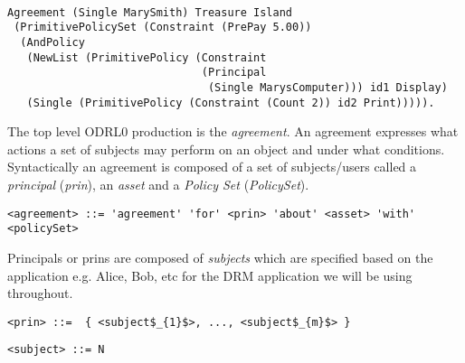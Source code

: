 \lstset{language=Coq}
\begin{lstlisting}[frame=single, caption={Coq version of agreement for Mary Smith},label={lst:marysmithagreementcoq}]

Agreement (Single MarySmith) Treasure Island 
 (PrimitivePolicySet (Constraint (PrePay 5.00))
  (AndPolicy 
   (NewList (PrimitivePolicy (Constraint 
                              (Principal 
                               (Single MarysComputer))) id1 Display)
   (Single (PrimitivePolicy (Constraint (Count 2)) id2 Print))))).
\end{lstlisting}



The top level ODRL0 production is the \emph{agreement}. An agreement expresses what actions a set of subjects may perform on an object and under what conditions. Syntactically an agreement is composed of a set of subjects/users called a \emph{principal} (\emph{prin}), an \emph{asset} and a \emph{Policy Set} (\emph{PolicySet}).

\lstset{language=AST}
\begin{lstlisting}[frame=single, caption={agreement},label={lst:agreementast}]
<agreement> ::= 'agreement' 'for' <prin> 'about' <asset> 'with' <policySet> 
\end{lstlisting}

Principals or prins are composed of \emph{subjects} which are specified based on the application e.g. Alice, Bob, etc for the DRM application we will be using throughout.

\lstset{mathescape, language=AST}  
\begin{lstlisting}[frame=single, caption={prin},label={lst:prinast}]
<prin> ::=  { <subject$_{1}$>, ..., <subject$_{m}$> }
\end{lstlisting}

\lstset{mathescape, language=AST}  
\begin{lstlisting}[frame=single, caption={subject},label={lst:subjectast}]
<subject> ::= N
\end{lstlisting}

